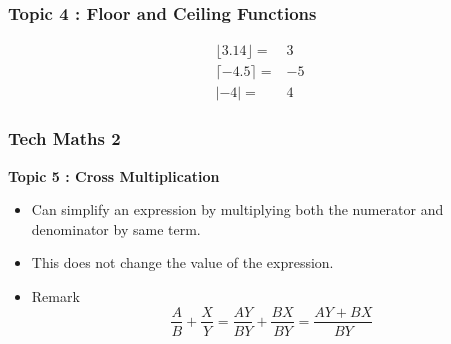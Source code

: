 \documentclass{beamer}
\begin{document}
\begin{frame}
	\frametitle{Topic 4 : Floor and Ceiling Functions}
	{
		\LARGE
		\begin{eqnarray}
		\lfloor 3.14 \rfloor =& 3 \\
		\lceil -4.5 \rceil =& -5 \\
		| -4 | =&  4
		\end{eqnarray}
	}
\end{frame}
\begin{frame}
	\frametitle{Tech Maths 2}
	\textbf{Topic 5 : Cross Multiplication}
	\Large 
	\begin{itemize}
		\item Can simplify an expression by multiplying both the numerator and denominator by same term.
		\item This does not change the value of the expression.
		\item Remark
		{
			\LARGE
		\[ \frac{A}{B} + \frac{X}{Y} = \frac{AY}{BY} + \frac{BX}{BY} = \frac{AY+BX}{BY}\]
	}
	\end{itemize}
\end{frame}
\end{document}
